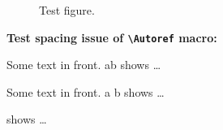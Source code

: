 \documentclass[showframe]{uit-thesis}
\begin{document}
\mainmatter

\lipsum[1]

\begin{figure}[t]
\caption{Test figure.}
\label{fig:test}
\end{figure}

\textbf{Test spacing issue of \texttt{\textbackslash{}Autoref} macro:}

Some text in front. ab shows \ldots

Some text in front. a  b shows \ldots

 shows \ldots
\end{document}
